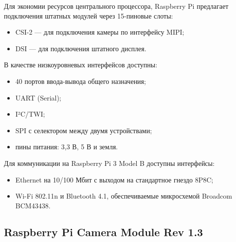 \documentclass[a4paper,11pt]{article}
\begin{document}
\noindent Для экономии ресурсов центрального процессора, Raspberry Pi предлагает подключения штатных модулей через 15-пиновые слоты:
\begin{itemize}
  \item CSI-2 — для подключения камеры по интерфейсу MIPI;
  \item DSI — для подключения штатного дисплея.
\end{itemize}
В качестве низкоуровневых интерфейсов доступны:
\begin{itemize}
  \item 40 портов ввода-вывода общего назначения;
  \item UART (Serial);
  \item I²C/TWI;
  \item SPI с селектором между двумя устройствами;
  \item пины питания: 3,3 В, 5 В и земля.
\end{itemize}
Для коммуникации на Raspberry Pi 3 Model B доступны интерфейсы:
\begin{itemize}
  \item Ethernet на 10/100 Мбит с выходом на стандартное гнездо 8P8C;
  \item Wi-Fi 802.11n и Bluetooth 4.1, обеспечиваемые микросхемой Broadcom BCM43438.
\end{itemize}

\subsection{Raspberry Pi Camera Module Rev 1.3}
\end{document}
